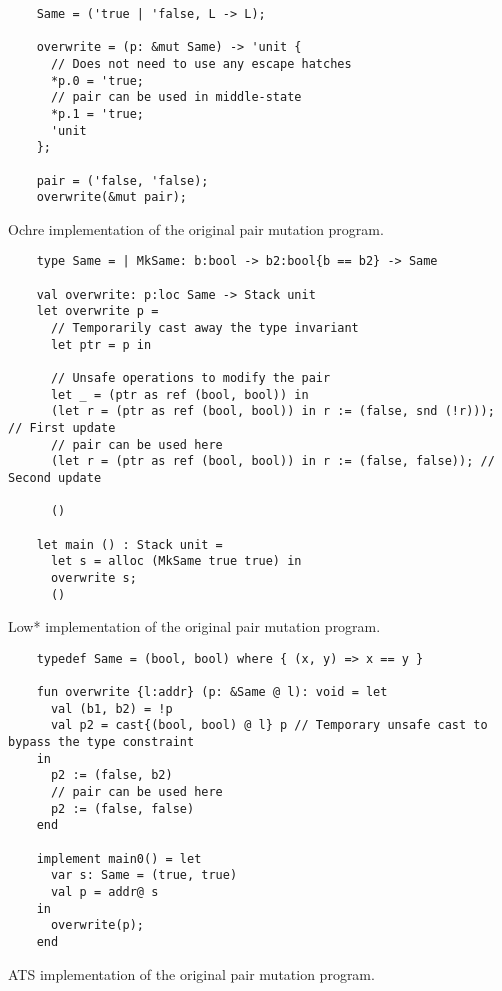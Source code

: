 \documentclass[12pt,twoside]{report}
\begin{document}
\begin{listing}
  \begin{verbatim}
    Same = ('true | 'false, L -> L); 
  
    overwrite = (p: &mut Same) -> 'unit {
      // Does not need to use any escape hatches
      *p.0 = 'true;
      // pair can be used in middle-state
      *p.1 = 'true;
      'unit
    };
  
    pair = ('false, 'false);          
    overwrite(&mut pair);
  \end{verbatim}
  \caption{Ochre implementation of the original pair mutation program.}
  \label{listing:pairmutationochreunsafe}
\end{listing}

\begin{listing}
  \begin{verbatim}
    type Same = | MkSame: b:bool -> b2:bool{b == b2} -> Same

    val overwrite: p:loc Same -> Stack unit
    let overwrite p =
      // Temporarily cast away the type invariant
      let ptr = p in

      // Unsafe operations to modify the pair
      let _ = (ptr as ref (bool, bool)) in
      (let r = (ptr as ref (bool, bool)) in r := (false, snd (!r))); // First update
      // pair can be used here
      (let r = (ptr as ref (bool, bool)) in r := (false, false)); // Second update

      ()

    let main () : Stack unit =
      let s = alloc (MkSame true true) in
      overwrite s;
      ()
  \end{verbatim}
  \caption{Low* implementation of the original pair mutation program.}
  \label{listing:pairmutationlowstarunsafe}
\end{listing}

\begin{listing}
  \begin{verbatim}
    typedef Same = (bool, bool) where { (x, y) => x == y }

    fun overwrite {l:addr} (p: &Same @ l): void = let
      val (b1, b2) = !p
      val p2 = cast{(bool, bool) @ l} p // Temporary unsafe cast to bypass the type constraint
    in
      p2 := (false, b2)
      // pair can be used here
      p2 := (false, false)
    end

    implement main0() = let
      var s: Same = (true, true)
      val p = addr@ s
    in
      overwrite(p);
    end
  \end{verbatim}
  \caption{ATS implementation of the original pair mutation program.}
  \label{listing:pairmutationatsunsafe}
\end{listing}
\end{document}
